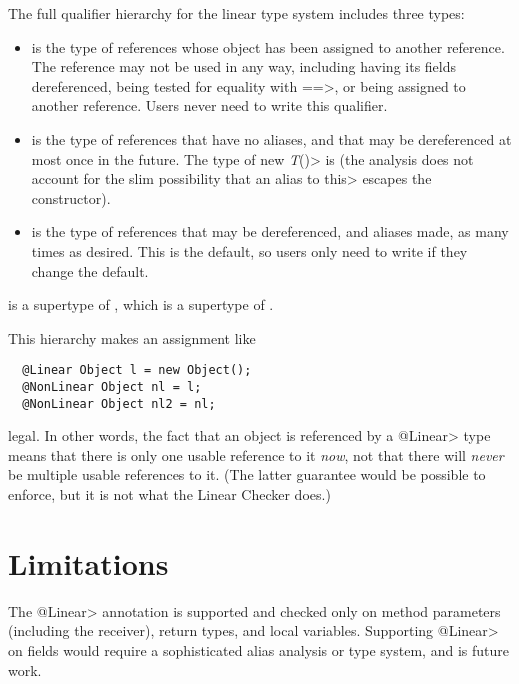 The full qualifier hierarchy for the linear type system includes three
types:
\begin{itemize}
\item
{} is the type of references whose object has been assigned to
another reference.  The reference may not be used in any way, including
having its fields dereferenced, being tested for equality with \<==>, or
being assigned to another reference.  Users never need to write this
qualifier.
\item
{} is the type of references that have no aliases, and that may
be dereferenced at most once in the future.  The type of \<new \emph{T}()> is
 (the analysis does not account for the slim
possibility that an alias to \<this> escapes the constructor).
\item
{} is the type of references that may be dereferenced, and
aliases made, as many times as desired.  This is the default, so users only
need to write  if they change the default.
\end{itemize}


\noindent
{} is a supertype of , which is a
supertype of .

This hierarchy makes an assignment like

\begin{Verbatim}
  @Linear Object l = new Object();
  @NonLinear Object nl = l;
  @NonLinear Object nl2 = nl;
\end{Verbatim}

\noindent
legal.  In other words, the fact that an object is referenced by a
\<@Linear> type means that there is only one usable reference to it \emph{now},
not that there will \emph{never} be multiple usable references to it.
(The latter guarantee would be possible to enforce, but it is not what the
Linear Checker does.)


\section{Limitations\label{linear-limitations}}

The \<@Linear> annotation is supported and checked only on method
parameters (including the receiver), return types, and local variables.
Supporting \<@Linear> on fields would require a sophisticated alias
analysis or type system, and is future work.

